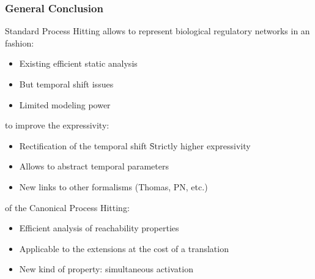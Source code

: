 
\begin{frame}[c]
  \frametitle{General Conclusion}

Standard Process Hitting allows to represent biological regulatory networks
in an  fashion:
\begin{itemize}
  \item Existing efficient static analysis
  \item But temporal shift issues
  \item Limited modeling power
\end{itemize}

\medskip
{} to improve the expressivity:
\begin{itemize}
  \item Rectification of the temporal shift \f Strictly higher expressivity
  \item Allows to abstract temporal parameters
  \item New links to other formalisms (Thomas, PN, etc.)
\end{itemize}

\medskip

 of the Canonical Process Hitting:
\begin{itemize}
  \item Efficient analysis of reachability properties
  \item Applicable to the extensions at the cost of a translation
  \item New kind of property: simultaneous activation
\end{itemize}


\end{frame}
